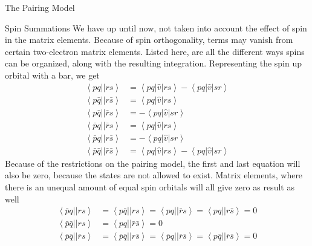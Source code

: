 \documentclass[twoside,english]{uiofysmaster}
\begin{document}
\begin{chapter}{The Pairing Model}
 	\begin{section}{Spin Summations}
 		We have up until now, not taken into account the effect of spin in the matrix elements. Because of spin orthogonality, terms may vanish from certain two-electron matrix elements. Listed here, are all the different ways spins can be organized, along with the resulting integration. Representing the spin up orbital with a bar, we get \cite{ShavittAndBartlett}
 		\begin{align}
 			\left< pq || rs \right> &= \left< pq | \hat v | rs \right> - \left< pq | \hat v | sr \right> \\
 			\left< p\bar q || r\bar s \right> &= \left<pq | \hat v | rs \right> \\
 			\left< p \bar q|| \bar r s \right> &= - \left<pq | \hat v | sr \right> \\
 			\left< \bar p q|| \bar r s\right> &= \left< pq | \hat v | rs \right> \\
 			\left< \bar p q|| r \bar s \right> &= - \left< pq | \hat v | sr \right> \\
 			\left< \bar p \bar q || \bar r \bar s \right> &= \left< pq | \hat v | rs \right> - \left< pq | \hat v | sr \right> 
 		\end{align}
 		Because of the restrictions on the pairing model, the first and last equation will also be zero, because the states are not allowed to exist. Matrix elements, where there is an unequal amount of equal spin orbitals will all give zero as result as well
 		\begin{align}
 			\left< \bar p q || rs \right> &= \left< p \bar q || rs \right> = \left< pq || \bar r s \right> = \left< pq || r \bar s \right> = 0 \\
 			\left< \bar p \bar q || rs \right> &= \left< pq || \bar r \bar s \right>  = 0 \\
 			\left< \bar p \bar q || \bar r s \right> &= \left< \bar p \bar q || r \bar s \right> = \left< \bar p q || \bar r \bar s \right> = \left< p \bar q || \bar r \bar s \right> = 0
 		\end{align} 


 	\end{section}

 	

 	

\end{chapter}
\end{document}
